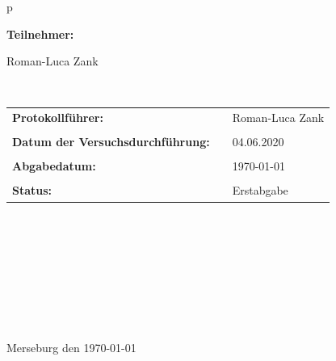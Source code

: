\begin{center}
\begin{tabular}{p{\textwidth}}
		
		
		\begin{center}
			\Large{\textbf{Teilnehmer:}} \\ 
		\end{center}
		\begin{center}
			\large{Roman-Luca Zank}
		\end{center}
		
		
		\\
		
		\begin{center}
			\begin{tabular}{lll}
				\large{\textbf{Protokollführer:}} & &  \large{Roman-Luca Zank}\\
				&&\\
				\large{\textbf{Datum der Versuchsdurchführung:}}&& \large{04.06.2020}\\
				&&\\
				\large{\textbf{Abgabedatum:}}&& \large{\today}\\
				&&\\
				\large{\textbf{Status:}}&& \large{Erstabgabe}\\
			\end{tabular}
		\end{center}
		
		\\ \\ \\ \\ \\ \\ \\ \\
		\large{Merseburg den \today}
		
	\end{tabular}
\end{center}
